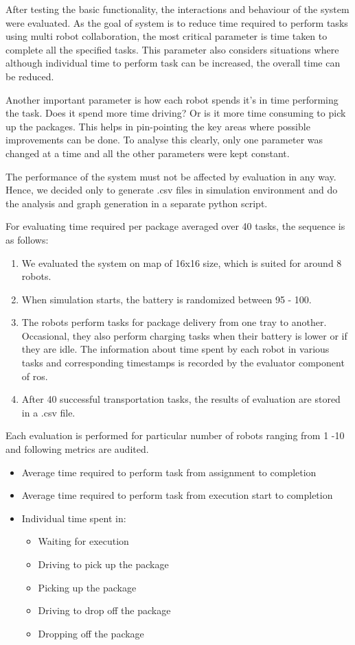 \documentclass[journal]{IEEEtran}
\begin{document}
After testing the basic functionality, the interactions and behaviour of the system were evaluated. As the goal of system is to reduce time required to perform tasks using multi robot collaboration, the most critical parameter is time taken to complete all the specified tasks. This parameter also considers situations where although individual time to perform task can be increased, the overall time can be reduced.

Another important parameter is how each robot spends it's in time performing the task. Does it spend more time driving? Or is it more time consuming to pick up the packages. This helps in pin-pointing the key areas where possible improvements can be done. To analyse this clearly, only one parameter was changed at a time and all the other parameters were kept constant.

The performance of the system must not be affected by evaluation in any way. Hence, we decided only to generate .csv files in simulation environment and do the analysis and graph generation in a separate python script. 

For evaluating time required per package averaged over 40 tasks, the sequence is as follows:

\begin{enumerate}
\item We evaluated the system on map of 16x16 size, which is suited for around 8 robots.
\item When simulation starts, the battery is randomized between 95 - 100.
\item The robots perform tasks for package delivery from one tray to another. Occasional, they also perform charging tasks when their battery is lower or if they are idle. The information about time spent by each robot in various tasks and corresponding timestamps is recorded by the evaluator component of ros. 
\item After 40 successful transportation tasks, the results of evaluation are stored in a .csv file.
\end{enumerate}

Each evaluation is performed for particular number of robots ranging from 1 -10 and following metrics are audited.

\begin{itemize}
\item Average time required to perform task from assignment to completion
\item Average time required to perform task from execution start to completion
\item Individual time spent in:	
\begin{itemize}
\item Waiting for execution
\item Driving to pick up the package	
\item Picking up the package	
\item Driving to drop off the package	
\item Dropping off the package		
\end{itemize}
\end{itemize}
\end{document}
